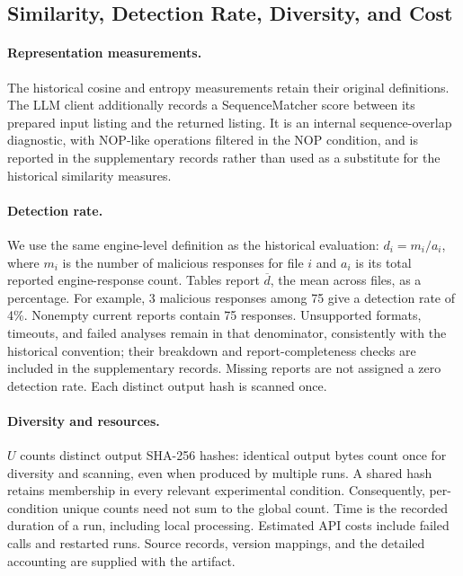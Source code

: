 \subsection{Similarity, Detection Rate, Diversity, and Cost}
\paragraph{Representation measurements.}
The historical cosine and entropy measurements retain their original
definitions. The LLM client additionally records a SequenceMatcher score
between its prepared input listing and the returned listing. It is an
internal sequence-overlap diagnostic, with NOP-like operations filtered in
the NOP condition, and is reported in the supplementary records rather
than used as a substitute for the historical similarity measures.

\paragraph{Detection rate.}
We use the same engine-level definition as the historical evaluation:
$d_i=m_i/a_i$, where $m_i$ is the number of malicious responses for file
$i$ and $a_i$ is its total reported engine-response count. Tables report
$\overline d$, the mean across files, as a percentage. For example,
3 malicious responses among 75 give a detection rate of 4\%.
Nonempty current reports contain 75 responses. Unsupported formats,
timeouts, and failed analyses remain in that denominator, consistently
with the historical convention; their breakdown and report-completeness
checks are included in the supplementary records. Missing reports are not
assigned a zero detection rate. Each distinct output hash is scanned once.

\paragraph{Diversity and resources.}
$U$ counts distinct output SHA-256 hashes: identical output bytes count
once for diversity and scanning, even when produced by multiple runs.
A shared hash retains membership in every relevant experimental condition.
Consequently, per-condition unique counts need not sum to the global count.
Time is the recorded duration of a run, including local processing.
Estimated API costs include failed calls and restarted runs. Source records,
version mappings, and the detailed accounting are supplied with the artifact.
